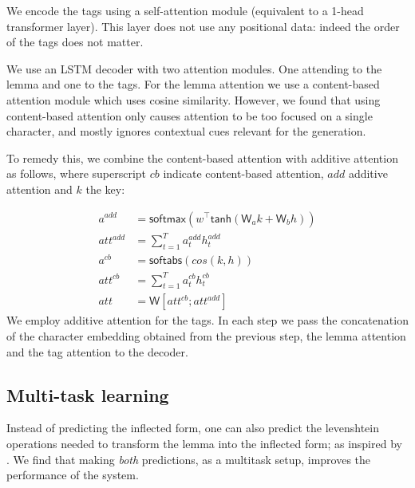 \documentclass[11pt,a4paper]{article}
\newcommand\jp[1]{\textbf{JP: #1}}
\begin{document}
We encode the tags using a self-attention module (equivalent to a
1-head transformer layer).  This layer does not use any positional
data: indeed the order of the tags does not matter.

We use an LSTM decoder with two attention modules. One attending to
the lemma and one to the tags. For the lemma attention we use a
content-based attention module \cite{graves2014neural,
karunaratne2021robust} which uses cosine similarity.  However, we
found that using content-based attention only causes attention to be
too focused on a single character, and mostly ignores contextual cues
relevant for the generation.

To remedy this, we combine the content-based attention with additive
attention as follows, where superscript $cb$ indicate content-based attention,
$add$ additive attention and $k$ the key:

\begin{align*}
	a^{add} & = \mathsf{softmax}(w^\top\mathsf{tanh}(\mathsf{W}_ak + \mathsf{W}_bh))\\
	att^{add} & = \sum_{t=1}^{T}a_t^{add}h_t^{add}\\
	a^{cb} & = \mathsf{softabs}(cos(k,h))\\
	att^{cb} & = \sum_{t=1}^{T}a_t^{cb}h_t^{cb}\\
	att & = \mathsf{W}[att^{cb}; att^{add}]
\end{align*}
We employ additive attention for the tags. In each step we pass the
concatenation of the character embedding obtained from the previous
step, the lemma attention and the tag attention to the decoder.


\subsection{Multi-task learning}

Instead of predicting the inflected form, one can also predict the
levenshtein operations needed to transform the lemma into the
inflected form; as inspired by \cite{DBLP:conf/conll/MakarovRC17}.
We find that making \emph{both} predictions, as a multitask setup,
improves the performance of the system.
\end{document}
